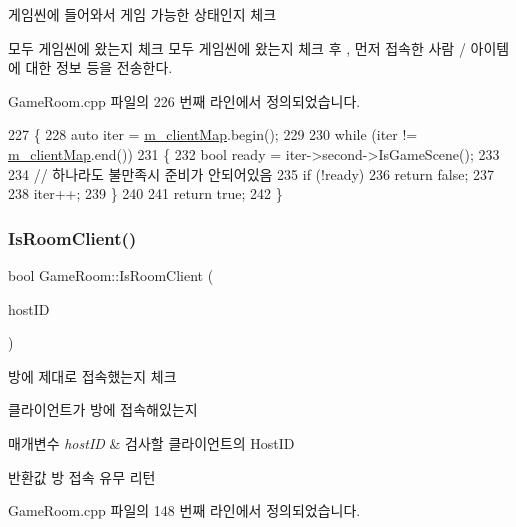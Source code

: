 게임씬에 들어와서 게임 가능한 상태인지 체크 

모두 게임씬에 왔는지 체크  모두 게임씬에 왔는지 체크 후 , 먼저 접속한 사람 / 아이템에 대한 정보 등을 전송한다. 

Game\+Room.\+cpp 파일의 226 번째 라인에서 정의되었습니다.


\begin{DoxyCode}
227 \{
228     \textcolor{keyword}{auto} iter = \hyperlink{class_game_room_afc202a511605453216f7dd870ff96c5c}{m\_clientMap}.begin();
229 
230     \textcolor{keywordflow}{while} (iter != \hyperlink{class_game_room_afc202a511605453216f7dd870ff96c5c}{m\_clientMap}.end())
231     \{
232         \textcolor{keywordtype}{bool} ready = iter->second->IsGameScene();
233 
234         \textcolor{comment}{// 하나라도 불만족시 준비가 안되어있음}
235         \textcolor{keywordflow}{if} (!ready)
236             \textcolor{keywordflow}{return} \textcolor{keyword}{false};
237 
238         iter++;
239     \}
240 
241     \textcolor{keywordflow}{return} \textcolor{keyword}{true};
242 \}
\end{DoxyCode}
\mbox{\label{class_game_room_a48687c02109ec932166223aa144c8c1f}} 
\subsubsection{\texorpdfstring{Is\+Room\+Client()}{IsRoomClient()}}
{\footnotesize\ttfamily bool Game\+Room\+::\+Is\+Room\+Client (\begin{DoxyParamCaption}\item[{Host\+ID}]{host\+ID }\end{DoxyParamCaption})}



방에 제대로 접속했는지 체크 

클라이언트가 방에 접속해있는지


\begin{DoxyParams}{매개변수}
{\em host\+ID} & 검사할 클라이언트의 Host\+ID \\
\hline
\end{DoxyParams}
\begin{DoxyReturn}{반환값}
방 접속 유무 리턴 
\end{DoxyReturn}


Game\+Room.\+cpp 파일의 148 번째 라인에서 정의되었습니다.


